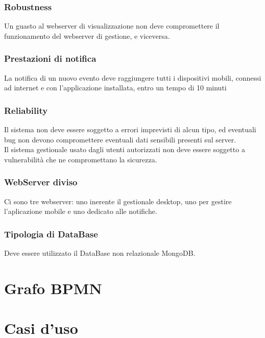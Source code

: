 \documentclass{article}
\begin{document}
\subsubsection{Robustness}
Un guasto al webserver di visualizzazione non deve compromettere il funzionamento del webserver di gestione, e viceversa.

\subsubsection{Prestazioni di notifica}
La notifica di un nuovo evento deve raggiungere tutti i dispositivi mobili, connessi ad internet e con l'applicazione installata, entro un tempo di 10 minuti

\subsubsection{Reliability}
Il sistema non deve essere soggetto a errori imprevisti di alcun tipo, ed eventuali bug non devono compromettere eventuali dati sensibili presenti sul server.\\
Il sistema gestionale usato dagli utenti autorizzati non deve essere soggetto a vulnerabilità che ne compromettano la sicurezza. 

\subsubsection{WebServer diviso}
Ci sono tre webserver: uno inerente il gestionale desktop, uno per gestire l'aplicazione mobile e uno dedicato alle notifiche.

\subsubsection{Tipologia di DataBase}
Deve essere utilizzato il DataBase non relazionale MongoDB.

\clearpage

\section{Grafo BPMN}
\clearpage

\section{Casi d'uso}
\end{document}
